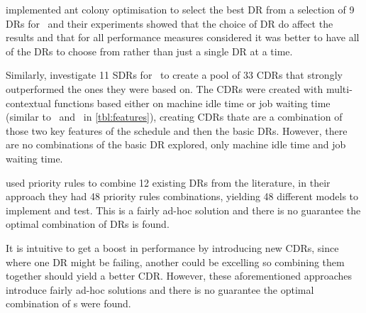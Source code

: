 \citet{Korytkowski13} implemented {ant colony optimisation} to select the 
best DR from a selection of 9 DRs for \JSP\ and their experiments showed 
that the choice of DR do affect the results and that for all performance 
measures considered it was better to have all of the DRs to choose from rather 
than just a single DR at a time. 

Similarly, \citet{Lu13} investigate 11 SDRs for \JSP\ to create a pool of 
33 CDRs that strongly outperformed the ones they were based on. The CDRs were 
created with {multi-contextual functions} based either on machine idle time 
or job waiting time (similar to \phiwait\ and \phimacSlack\ in 
\cref{tbl:features}), creating CDRs thate are a combination of those 
two key features of the schedule and then the basic DRs. However, there are no 
combinations of the basic DR explored, only machine idle time and job waiting 
time.  

\citet{Yu13} used priority rules to combine 12 existing DRs from the 
literature, in their approach they had 48 priority rules combinations, 
yielding 48 different models to implement and test. This is a fairly 
ad-hoc solution and there is no guarantee the optimal combination of DRs is 
found. 

It is intuitive to get a boost in performance by introducing new CDRs, since 
where one DR might be failing, another could be excelling so combining them 
together should yield a better CDR. However, these aforementioned approaches 
introduce fairly ad-hoc solutions and there is no guarantee the optimal 
combination of \dr s were found.

